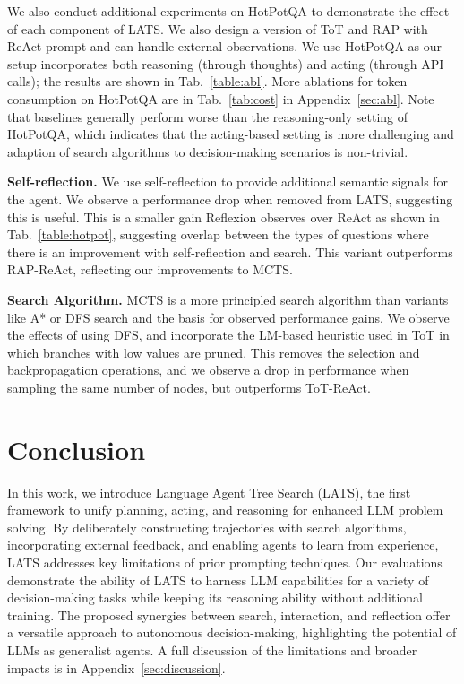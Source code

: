\documentclass{article} \usepackage{iclr2024_conference,times}
\begin{document}
We also conduct additional experiments on HotPotQA to demonstrate the effect of each component of LATS. We also design a version of ToT and RAP with ReAct prompt and can handle external observations. We use HotPotQA as our setup incorporates both reasoning (through thoughts) and acting (through API calls); the results are shown in Tab.~\ref{table:abl}. More ablations for token consumption on HotPotQA are in Tab.~\ref{tab:cost} in Appendix~\ref{sec:abl}. Note that baselines generally perform worse than the reasoning-only setting of HotPotQA, which indicates that the acting-based setting is more challenging and adaption of search algorithms to decision-making scenarios is non-trivial.

\textbf{Self-reflection.} We use self-reflection to provide additional semantic signals for the agent. We observe a  performance drop when removed from LATS, suggesting this is useful. This is a smaller gain Reflexion \citep{shinn2023reflexion} observes over ReAct \citep{yao2023react} as shown in Tab.~\ref{table:hotpot}, suggesting overlap between the types of questions where there is an improvement with self-reflection and search. This variant outperforms RAP-ReAct, reflecting our improvements to MCTS.

\textbf{Search Algorithm.} MCTS is a more principled search algorithm than variants like A* or DFS search and the basis for observed performance gains. We observe the effects of using DFS, and incorporate the LM-based heuristic used in ToT \citep{yao2023tree} in which branches with low values are pruned. This removes the selection and backpropagation operations, and we observe a  drop in performance when sampling the same number of nodes, but outperforms ToT-ReAct.

\section{Conclusion}

In this work, we introduce Language Agent Tree Search (LATS), the first framework to unify planning, acting, and reasoning for enhanced LLM problem solving. By deliberately constructing trajectories with search algorithms, incorporating external feedback, and enabling agents to learn from experience, LATS addresses key limitations of prior prompting techniques. Our evaluations demonstrate the ability of LATS to harness LLM capabilities for a variety of decision-making tasks while keeping its reasoning ability without additional training. The proposed synergies between search, interaction, and reflection offer a versatile approach to autonomous decision-making, highlighting the potential of LLMs as generalist agents. A full discussion of the limitations and broader impacts is in  Appendix~\ref{sec:discussion}.
\end{document}
